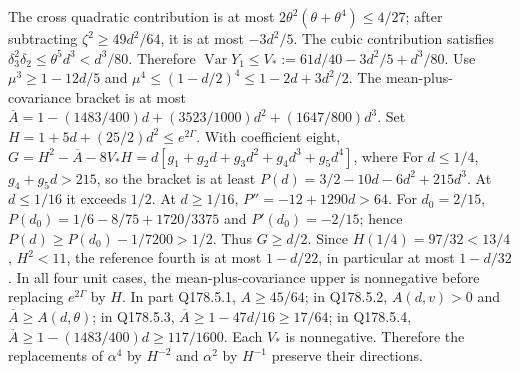 The cross quadratic contribution is at most
$2\theta^2(\theta+\theta^4)\le\allowbreak 4/27$;
after subtracting $\zeta^2\ge\allowbreak 49d^2/64$, it is at most $-3d^2/5$.
The cubic contribution satisfies
$\delta_3^2\delta_2\le\allowbreak \theta^5d^3<\allowbreak d^3/80$.
Therefore $\operatorname{Var}Y_1\le\allowbreak  V_*:=\allowbreak 61d/40-3d^2/5+d^3/80$.
Use $\mu^3\ge\allowbreak 1-12d/5$ and
$\mu^4\le\allowbreak (1-d/2)^4\le\allowbreak 1-2d+3d^2/2$.
The mean-plus-covariance bracket is at most
$\overline A=\allowbreak 1-(1483/400)d+(3523/1000)d^2+(1647/800)d^3$.
Set $H=\allowbreak 1+5d+(25/2)d^2\le\allowbreak  e^{2\Gamma}$.
With coefficient eight,
$G=\allowbreak H^2-\overline A-8V_*H=\allowbreak d[g_1+g_2d+g_3d^2+g_4d^3+g_5d^4]$,
where
For $d\le\allowbreak 1/4$, $g_4+g_5d>\allowbreak 215$, so the bracket is at least
$P(d)=\allowbreak 3/2-10d-6d^2+215d^3$.
At $d\le\allowbreak 1/16$ it exceeds $1/2$.
At $d\ge\allowbreak 1/16$, $P''=\allowbreak -12+1290d>\allowbreak 64$.
For $d_0=\allowbreak 2/15$, $P(d_0)=\allowbreak 1/6-8/75+1720/3375$ and
$P'(d_0)=\allowbreak -2/15$; hence $P(d)\ge\allowbreak  P(d_0)-1/7200>\allowbreak 1/2$.
Thus $G\ge\allowbreak  d/2$. Since $H(1/4)=\allowbreak 97/32<\allowbreak 13/4$, $H^2<\allowbreak 11$,
the reference fourth is at most $1-d/22$, in particular at most $1-d/32$.
In all four unit cases, the mean-plus-covariance upper is nonnegative
before replacing $e^{2\Gamma}$ by $H$.
In part Q178.5.1, $A\ge\allowbreak 45/64$; in Q178.5.2, $A(d,\allowbreak v)>\allowbreak 0$ and
$\overline A\ge\allowbreak  A(d,\allowbreak \theta)$; in Q178.5.3,
$\overline A\ge\allowbreak 1-47d/16\ge\allowbreak 17/64$; in Q178.5.4,
$\overline A\ge\allowbreak 1-(1483/400)d\ge\allowbreak 117/1600$.
Each $V_*$ is nonnegative. Therefore the replacements of $\alpha^4$
by $H^{-2}$ and $\alpha^2$ by $H^{-1}$ preserve their directions.


